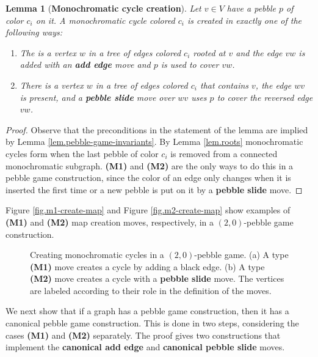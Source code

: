 \documentclass[11pt]{article}
\newcommand{\reffig}[1]{Figure \ref{fig.#1}}
\newtheorem{lemma}[theorem]{Lemma}
\newcommand{\reflem}[1]{Lemma \ref{lem.#1}}
\newcommand{\labellem}[1]{\label{lem.#1}}
\begin{document}
\begin{lemma}[{\bf Monochromatic cycle creation}]\labellem{how-maps-form}
	Let $v\in V$ have a pebble $p$ of color $c_{i}$ on it. 
	A  monochromatic cycle colored $c_{i}$ is created in exactly one of the following ways: 
	\begin{enumerate}
		\item[{\bf (M1)}] The is a vertex $w$ in a tree of edges colored $c_i$ rooted at
		$v$ and the edge $vw$ is added with an {\bf add edge} move and $p$ is used to cover $vw$.
		\item[{\bf (M2)}] There is a vertex $w$ in a tree of edges colored $c_i$ that 
		contains $v$, the edge $wv$ is present, and a {\bf pebble slide} move 
		over $wv$ uses $p$ to cover the reversed edge $vw$.
	\end{enumerate}
	\end{lemma}
	 \begin{proof}
	 	Observe that the preconditions in the statement of the lemma are implied by
	 	 \reflem{pebble-game-invariants}. By \reflem{roots}  monochromatic 
	 	cycles form when the last pebble of color $c_{i}$ is removed from a 
	 	connected monochromatic subgraph. {\bf (M1)} and {\bf (M2)} 
	 	are the only ways to do this in a pebble game construction, since the 
		color of an edge only changes when it is inserted the first time 
		or a new pebble is put on it by a {\bf pebble slide} move.
	 \end{proof}
	
	\reffig{m1-create-map} and \reffig{m2-create-map} show examples of 
	{\bf (M1)} and {\bf (M2)} map creation moves, respectively, 
	in a $(2,0)$-pebble game construction.
	
	\begin{figure}[htbp]
		\centering
		\hspace{.3in}
		\caption{Creating monochromatic cycles in a $(2,0)$-pebble game. (a) A type {\bf (M1)} move creates a cycle by adding a black edge.  (b) A type {\bf (M2)} move creates a cycle with a {\bf pebble slide} move.
		The vertices are labeled according to their role in the definition of the moves.}
		\end{figure}
	
	We next show that if a graph has a pebble game construction, then it has a canonical pebble 
	game construction.  This is done in two steps, considering the cases {\bf (M1)} and {\bf (M2)}
	separately.  The proof gives two constructions that implement the {\bf canonical add edge}
	and {\bf canonical pebble slide} moves.
	
\end{document}
